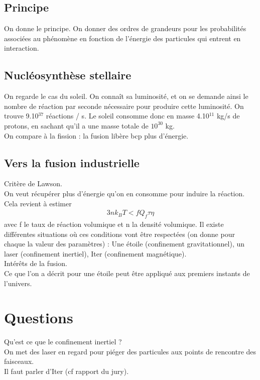 \documentclass[12pt,prb,aps,epsf]{article}
\begin{document}
 \subsection{Principe}
 On donne le principe. On donner des ordres de grandeurs pour les probabilités associées au phénomène en fonction de l'énergie des particules qui entrent en interaction.
 
 \subsection{Nucléosynthèse stellaire}
 On regarde le cas du soleil. On connaît sa luminosité, et on se demande ainsi le nombre de réaction par seconde nécessaire pour produire cette luminosité. On trouve 9.10$^{37}$ réactions / s. Le soleil consomme donc en masse 4.10$^{11}$ kg/s de protons, en sachant qu'il a une masse totale de $10^{30}$ kg.\\
 
 On compare à la fission : la fusion libère bcp plus d'énergie.
 
 \subsection{Vers la fusion industrielle}
 Critère de Lawson. \\
 On veut récupérer plus d'énergie qu'on en consomme pour induire la réaction. Cela revient à estimer 
 \begin{eqnarray}
 3 n k_B T < fQ_f \tau \eta
 \end{eqnarray}
avec f le taux de réaction volumique et n la densité volumique. Il existe différentes situations où ces conditions vont être respectées (on donne pour chaque la valeur des paramètres) : Une étoile (confinement gravitationnel), un laser (confinement inertiel), Iter (confinement magnétique).\\

Intérêts de la fusion. \\
Ce que l'on a décrit pour une étoile peut être appliqué aux premiers instants de l'univers.

\section*{Questions}
Qu'est ce que le confinement inertiel ?\\
On met des laser en regard pour piéger des particules aux points de rencontre des faisceaux.\\
Il faut parler d'Iter (cf rapport du jury).
\end{document}
